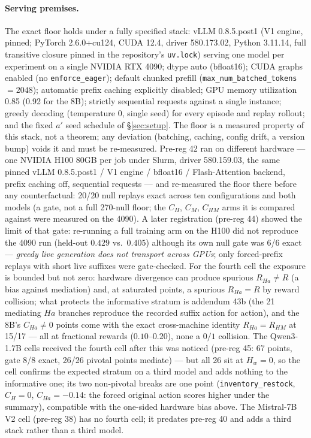 \documentclass{article}
\theoremstyle{remark}
\begin{document}
\paragraph{Serving premises.} The exact floor holds under a fully specified
stack: vLLM 0.8.5.post1 (V1 engine, pinned; PyTorch 2.6.0+cu124, CUDA 12.4,
driver 580.173.02, Python 3.11.14, full transitive closure pinned in the
repository's \texttt{uv.lock}) serving one model per experiment
on a single NVIDIA RTX 4090; dtype auto (bfloat16); CUDA graphs enabled (no
\texttt{enforce\_eager}); default chunked prefill
(\texttt{max\_num\_batched\_tokens} $= 2048$); automatic prefix caching
explicitly disabled; GPU memory utilization 0.85 (0.92 for the 8B); strictly
sequential requests against a single instance; greedy decoding (temperature
0, single seed) for every episode and replay rollout; and the fixed $a'$
seed schedule of \S\ref{sec:setup}. The floor is a measured property of this
stack, not a theorem; any deviation (batching, caching, config drift, a
version bump) voids it
and must be re-measured. Pre-reg 42 ran on different hardware --- one
NVIDIA H100 80GB per job under Slurm, driver 580.159.03, the same pinned
vLLM 0.8.5.post1 / V1 engine / bfloat16 / Flash-Attention backend, prefix
caching off, sequential requests --- and re-measured the floor there
before any counterfactual: 20/20 null replays exact across ten
configurations and both models (a gate, not a full 270-null floor; the
$C_H$, $C_M$, $C_{HM}$ arms it is compared against were measured on the
4090). A later registration (pre-reg 44) showed the limit of that gate:
re-running a full training arm on the H100 did not reproduce the 4090
run (held-out $0.429$ vs.\ $0.405$) although its own null gate was 6/6
exact --- \emph{greedy live generation does not transport across GPUs};
only forced-prefix replays with short live suffixes were gate-checked.
For the fourth cell the exposure is bounded but not zero: hardware
divergence can produce spurious $R_{Ha} \neq R$ (a bias against
mediation) and, at saturated points, a spurious $R_{Ha} = R$ by reward
collision; what protects the informative stratum is addendum 43b (the
21 mediating $Ha$ branches reproduce the recorded suffix action for
action), and the 8B's $C_{Ha} \neq 0$ points come with the exact
cross-machine identity $R_{Ha} = R_{HM}$ at 15/17 --- all at fractional
rewards ($0.10$--$0.20$), none a $0/1$ collision. The Qwen3-1.7B cells received the fourth cell after
this was noticed (pre-reg 45: 67 points, gate 8/8 exact, 26/26 pivotal
points mediate) --- but all 26 sit at $H_w = 0$, so the cell confirms the
expected stratum on a third model and adds nothing to the informative
one; its two non-pivotal breaks are one point (\texttt{inventory\_restock},
$C_H = 0$, $C_{Ha} = -0.14$: the forced original action scores higher
under the summary), compatible with the one-sided hardware bias above.
The Mistral-7B V2 cell (pre-reg 38) has no fourth cell; it predates
pre-reg 40 and adds a third stack rather than a third model.
\end{document}
